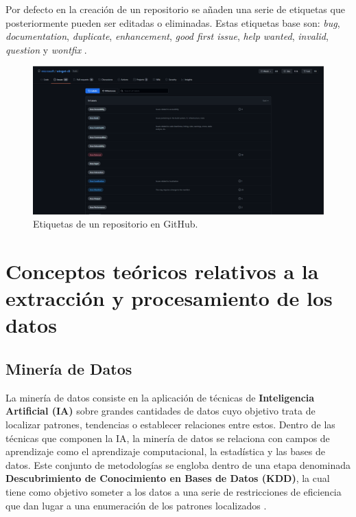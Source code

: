 Por defecto en la creación de un repositorio se añaden una serie de etiquetas que posteriormente pueden ser editadas o eliminadas. Estas etiquetas base son: \emph{bug}, \emph{documentation}, \emph{duplicate}, \emph{enhancement}, \emph{good first issue}, \emph{help wanted}, \emph{invalid}, \emph{question} y \emph{wontfix} \cite{ct:github_managing_labels}.

\begin{figure}[!ht]
	\centering
\includegraphics[width=\textwidth]{img/gh_repository_tags.png}
	\caption{Etiquetas de un repositorio en GitHub.}
	\label{fig:gh_repository_tags}
\end{figure}

\section{Conceptos teóricos relativos a la extracción y procesamiento de los datos} \label{sec:conceptosextraccionprocesamiento}

\subsection{Minería de Datos} \label{sec:mineriadatos}

La minería de datos consiste en la aplicación de técnicas de \textbf{Inteligencia Artificial (IA)} sobre grandes cantidades de datos cuyo objetivo trata de localizar patrones, tendencias o establecer relaciones entre estos. Dentro de las técnicas que componen la IA, la minería de datos se relaciona con campos de aprendizaje como el aprendizaje computacional, la estadística y las bases de datos. Este conjunto de metodologías se engloba dentro de una etapa denominada \textbf{Descubrimiento de Conocimiento en Bases de Datos (KDD)}, la cual tiene como objetivo someter a los datos a una serie de restricciones de eficiencia que dan lugar a una enumeración de los patrones localizados \cite{ct:machine_learning}.

